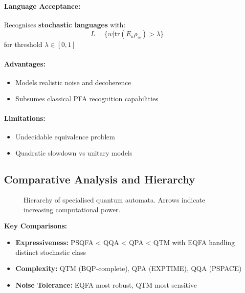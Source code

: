 \paragraph{Language Acceptance:}
Recognises \textbf{stochastic languages} with:
\[
L = \{w | \text{tr}(E_a \rho_w) > \lambda\}
\]
for threshold $\lambda \in [0,1]$ \cite{hirvensalo2012quantum}

\paragraph{Advantages:}
\begin{itemize}
    \item Models realistic noise and decoherence
    \item Subsumes classical PFA recognition capabilities
\end{itemize}

\paragraph{Limitations:}
\begin{itemize}
    \item Undecidable equivalence problem
    \item Quadratic slowdown vs unitary models
\end{itemize}

\subsection*{Comparative Analysis and Hierarchy}
\begin{figure}[h]
\centering
{}
\caption{Hierarchy of specialised quantum automata. Arrows indicate increasing computational power.}
\label{fig:specialised-hierarchy}
\end{figure}

\textbf{Key Comparisons:}
\begin{itemize}
    \item \textbf{Expressiveness:} PSQFA < QQA < QPA < QTM with EQFA handling distinct stochastic class
    \item \textbf{Complexity:} QTM (BQP-complete), QPA (EXPTIME), QQA (PSPACE)
    \item \textbf{Noise Tolerance:} EQFA most robust, QTM most sensitive
\end{itemize}